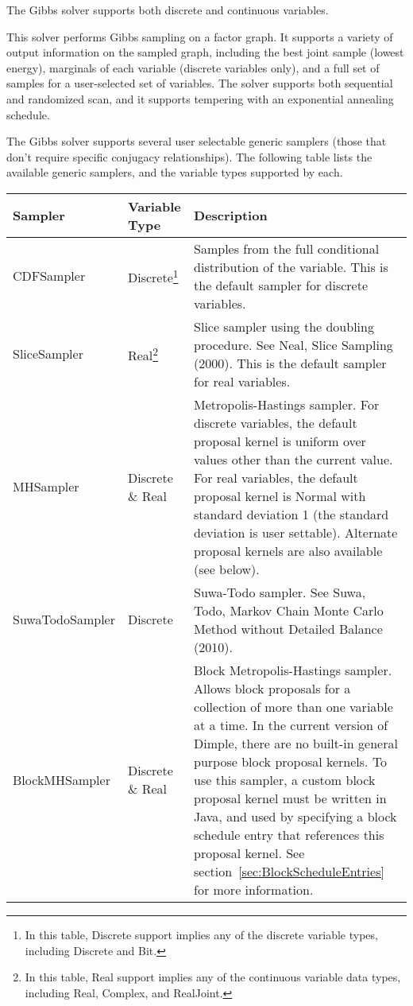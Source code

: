 The Gibbs solver supports both discrete and continuous variables.

This solver performs Gibbs sampling on a factor graph.  It supports a variety of output information on the sampled graph, including the best joint sample (lowest energy), marginals of each variable (discrete variables only), and a full set of samples for a user-selected set of variables.  The solver supports both sequential and randomized scan, and it supports tempering with an exponential annealing schedule.

The Gibbs solver supports several user selectable generic samplers (those that don't require specific conjugacy relationships).  The following table lists the available generic samplers, and the variable types supported by each.

\begin{longtable} {l l p{8.0cm}}
Sampler & Variable Type &  Description \\
\hline
\endhead
CDFSampler & Discrete\footnote{In this table, Discrete support implies any of the discrete variable types, including Discrete and Bit.} & Samples from the full conditional distribution of the variable.  This is the default sampler for discrete variables. \\
SliceSampler & Real\footnote{In this table, Real support implies any of the continuous variable data types, including Real, Complex, and RealJoint.} & Slice sampler using the doubling procedure.  See Neal, Slice Sampling (2000).  This is the default sampler for real variables. \\
MHSampler & Discrete \& Real & Metropolis-Hastings sampler.  For discrete variables, the default proposal kernel is uniform over values other than the current value.  For real variables, the default proposal kernel is Normal with standard deviation 1 (the standard deviation is user settable).  Alternate proposal kernels are also available (see below). \\
SuwaTodoSampler & Discrete & Suwa-Todo sampler.  See Suwa, Todo, Markov Chain Monte Carlo Method without Detailed Balance (2010). \\
BlockMHSampler & Discrete \& Real & Block Metropolis-Hastings sampler.  Allows block proposals for a collection of more than one variable at a time.  In the current version of Dimple, there are no built-in general purpose block proposal kernels.  To use this sampler, a custom block proposal kernel must be written in Java, and used by specifying a block schedule entry that references this proposal kernel.  See section~\ref{sec:BlockScheduleEntries} for more information.
\end{longtable}


